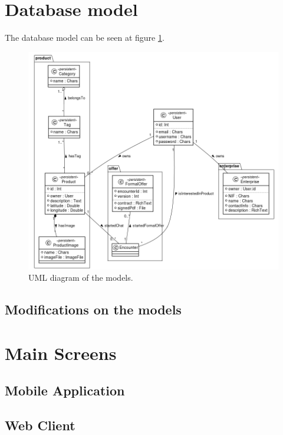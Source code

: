 \documentclass[./main.tex]{subfiles}
\begin{document}
\section{Database model}
The database model can be seen at figure \ref{fig:model-uml}.

\begin{figure}[H]
\centering
\includegraphics[width=\linewidth]{img/database-model.png}
\caption{UML diagram of the models.}
\label{fig:model-uml}
\end{figure}

\subsection{Modifications on the models}

\section{Main Screens} \label{sec:views}

\subsection{Mobile Application}

\subsection{Web Client}
\end{document}
